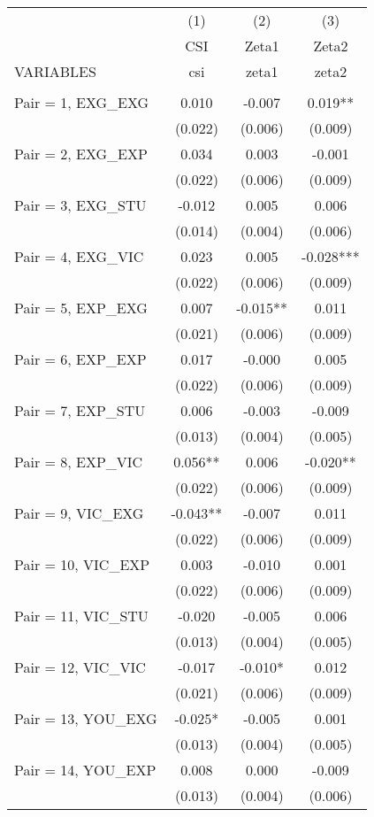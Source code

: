 \documentclass[]{article}
\begin{document}
\begin{tabular}{lccc} \hline
 & (1) & (2) & (3) \\
 & CSI & Zeta1 & Zeta2 \\
VARIABLES & csi & zeta1 & zeta2 \\ \hline
 &  &  &  \\
Pair = 1, EXG\_EXG & 0.010 & -0.007 & 0.019** \\
 & (0.022) & (0.006) & (0.009) \\
Pair = 2, EXG\_EXP & 0.034 & 0.003 & -0.001 \\
 & (0.022) & (0.006) & (0.009) \\
Pair = 3, EXG\_STU & -0.012 & 0.005 & 0.006 \\
 & (0.014) & (0.004) & (0.006) \\
Pair = 4, EXG\_VIC & 0.023 & 0.005 & -0.028*** \\
 & (0.022) & (0.006) & (0.009) \\
Pair = 5, EXP\_EXG & 0.007 & -0.015** & 0.011 \\
 & (0.021) & (0.006) & (0.009) \\
Pair = 6, EXP\_EXP & 0.017 & -0.000 & 0.005 \\
 & (0.022) & (0.006) & (0.009) \\
Pair = 7, EXP\_STU & 0.006 & -0.003 & -0.009 \\
 & (0.013) & (0.004) & (0.005) \\
Pair = 8, EXP\_VIC & 0.056** & 0.006 & -0.020** \\
 & (0.022) & (0.006) & (0.009) \\
Pair = 9, VIC\_EXG & -0.043** & -0.007 & 0.011 \\
 & (0.022) & (0.006) & (0.009) \\
Pair = 10, VIC\_EXP & 0.003 & -0.010 & 0.001 \\
 & (0.022) & (0.006) & (0.009) \\
Pair = 11, VIC\_STU & -0.020 & -0.005 & 0.006 \\
 & (0.013) & (0.004) & (0.005) \\
Pair = 12, VIC\_VIC & -0.017 & -0.010* & 0.012 \\
 & (0.021) & (0.006) & (0.009) \\
Pair = 13, YOU\_EXG & -0.025* & -0.005 & 0.001 \\
 & (0.013) & (0.004) & (0.005) \\
Pair = 14, YOU\_EXP & 0.008 & 0.000 & -0.009 \\
 & (0.013) & (0.004) & (0.006) \\

\end{tabular}
\end{document}
